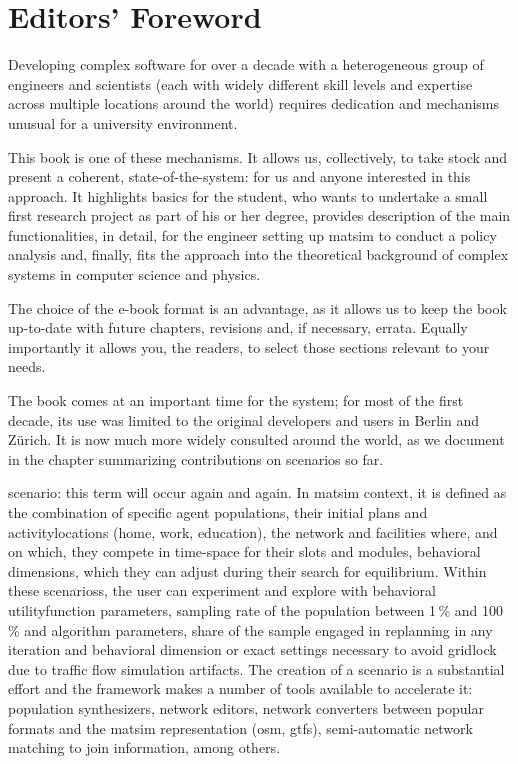 \chapter*{Editors' Foreword}


Developing complex software for over a decade with a heterogeneous group of engineers and scientists (each with widely different skill levels and expertise across multiple locations around the world) requires dedication and mechanisms unusual for a university environment. 

This book is one of these mechanisms. It allows us, collectively, to take stock and present a coherent, state-of-the-system: for us and anyone interested in this approach. It highlights  basics for the student, who wants to undertake a small first research project as part of his or her degree, provides description of the main functionalities, in detail, for the engineer setting up \gls{matsim} to conduct a policy analysis and, finally, fits the approach into the theoretical background of complex systems in computer science and physics. 

The choice of the e-book format is an advantage, as it allows us to keep the book up-to-date with future chapters, revisions and, if necessary, errata. Equally importantly it allows you, the readers, to select those sections relevant to your needs. 

The book comes at an important time for the system; for most of the first decade, its use was limited to the original developers and users in Berlin and Zürich. It is now much more widely consulted around the world, as we document in the chapter summarizing contributions on \glspl{scenario} so far. 

\Gls{scenario}: this term will occur again and again. In \gls{matsim} context, it is defined as the combination of specific agent populations, their initial \glspl{plan} and \glspl{activitylocation} (home, work, education), the network and facilities where, and on which, they compete in time-space for their slots and modules, \ie behavioral dimensions, which they can adjust during their search for equilibrium. Within these \glspl{scenario}s, the user can experiment and explore with behavioral \gls{utilityfunction} parameters, sampling rate of the population between 1\,\% and 100\,\% and algorithm parameters, \ie share of the sample engaged in \gls{replanning} in any \gls{iteration} and behavioral dimension or exact settings necessary to avoid gridlock due to traffic flow simulation artifacts. The creation of a \gls{scenario} is a substantial effort and the \gls{framework} makes a number of tools available to accelerate it: population synthesizers, network editors, network converters between popular formats and the \gls{matsim} representation (\eg \gls{osm}, \gls{gtfs}), semi-automatic network matching to join information, among others.


